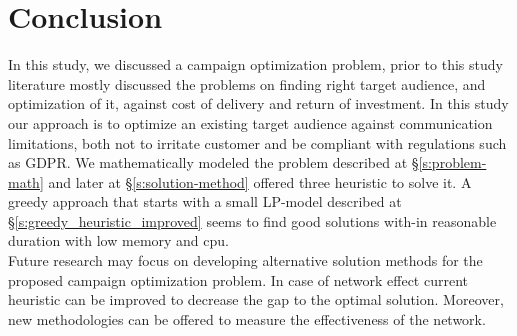 \documentclass[11pt]{article}
\begin{document}
\section{Conclusion} \label{s:conclusion}
In this study, we discussed a campaign optimization problem, prior to this study literature mostly discussed the problems on finding right target audience, and optimization of it, against cost of delivery and return of investment. In this study our approach is to optimize an existing target audience against communication limitations, both not to irritate customer and be compliant with regulations such as GDPR. We mathematically modeled the problem described at \S \ref{s:problem-math} and later at \S \ref{s:solution-method} offered three heuristic to solve it. A greedy approach that starts with a small LP-model described at \S \ref{s:greedy_heuristic_improved} seems to find good solutions with-in reasonable duration with low memory and cpu.\\
Future research may focus on developing alternative solution methods for the proposed campaign optimization problem. In case of network effect current heuristic can be improved to decrease the gap to the optimal solution. Moreover, new methodologies can be offered to measure the effectiveness of the network.
\newpage




\end{document}
